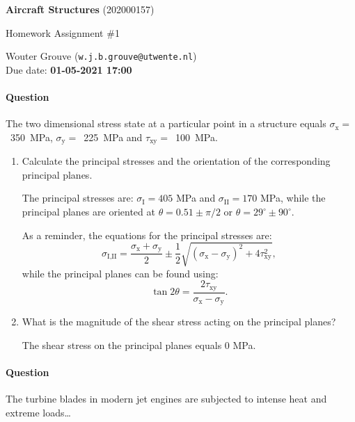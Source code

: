 \documentclass[a4paper,12pt,fleqn]{article}
\makeatletter
\newcounter{question}
\newcommand*\question{%
  \stepcounter{question}%
  \paragraph{Question \thequestion}}
\newcommand{\coursename}{Aircraft Structures}
\newcommand{\coursecode}{202000157}
\newcommand{\assigntype}{Homework Assignment \#1}
\newcommand{\duedate}{01-05-2021 17:00}
\newcommand{\teacher}{Wouter Grouve (\texttt{w.j.b.grouve@utwente.nl})}
\makeatother
\begin{document}
%
%

\noindent\makebox[\linewidth]{\rule{\textwidth}{0.4pt}}

\begin{center}
  \Large \textbf{\coursename} (\coursecode)
\end{center}

\begin{center}
  \large \assigntype{} \\
  \vspace{3mm}
\end{center}

\begin{center}
  \teacher\\
  Due date: \textbf{\duedate}
\end{center}

\noindent\makebox[\linewidth]{\rule{\textwidth}{0.4pt}}


%
%

\question The two dimensional stress state at a particular point in a
structure equals \mbox{$\sigma_{\text{x}} =$ 350 MPa},
\mbox{$\sigma_{\text{y}} =$ 225 MPa} and \mbox{$\tau_{\text{xy}} =$
  100 MPa}.
\begin{enumerate}
\item{} Calculate the principal stresses and the orientation of the
  corresponding principal planes.
  \begin{answer}
    The principal stresses are: $\sigma_{\textrm{I}} = 405$ MPa and
    $\sigma_{\textrm{II}} = 170$ MPa, while the principal planes are
    oriented at $\theta = 0.51 \pm \pi/2$ or
    $\theta = 29^{\circ} \pm 90^{\circ}$.

    As a reminder, the equations for the principal stresses are:
    \begin{equation*}
      \sigma_{\textrm{I,II}} = \frac{\sigma_{\textrm{x}} + \sigma_{\textrm{y}}}{2} \pm
      \frac{1}{2}\sqrt{(\sigma_{\textrm{x}} - \sigma_{\textrm{y}})^2 + 4\tau^2_{\textrm{xy}}},
    \end{equation*}
    while the principal planes can be found using:
    \begin{equation*}
      \tan 2\theta = \frac{2\tau_{\textrm{xy}}}{\sigma_{\textrm{x}} - \sigma_{\textrm{y}}}.
    \end{equation*}
  \end{answer}
\item{} What is the magnitude of the shear stress acting on the
  principal planes?
  \begin{answer}
    The shear stress on the principal planes equals 0 MPa.
  \end{answer}
\end{enumerate}

\question The turbine blades in modern jet engines are subjected to
intense heat and extreme loads\ldots

\label{finalpage}
\end{document}
